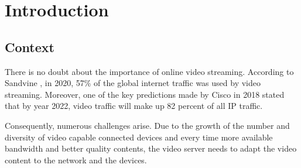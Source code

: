 \chapter{Introduction}
\label{chap:introduction}

\section{Context}
\label{sec:context}


There is no doubt about the importance of online video streaming.
According to Sandvine \cite{sandvine1},
in 2020, 57\% of the global internet traffic was used by video streaming.
Moreover, one of the key predictions made by Cisco in 2018 \cite{cisco1}
stated that by year 2022, video traffic will make up 82 percent 
of all IP traffic.


Consequently, numerous challenges arise. Due to the
growth of the number and diversity of video capable connected 
devices and every time more available bandwidth and better quality 
contents, the video server needs to adapt the video content to
the network and the devices. 
